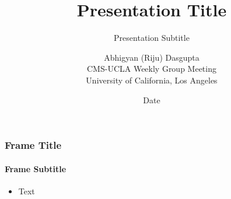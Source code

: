 \documentclass{beamer}
\title{Presentation Title}
\subtitle{Presentation Subtitle}
\author[Abhigyan (Riju) Dasgupta]{
	Abhigyan (Riju) Dasgupta \\[1em]
	\scriptsize CMS-UCLA Weekly Group Meeting\\
	\scriptsize University of California, Los Angeles}
\date{Date}
\begin{document}
	\frame{\titlepage}

	\setCCUSlideLogo

	\begin{frame}
		\frametitle{Frame Title}
		\framesubtitle{Frame Subtitle}
		\begin{itemize}
			\item Text
		\end{itemize}
	\end{frame}
\end{document}

